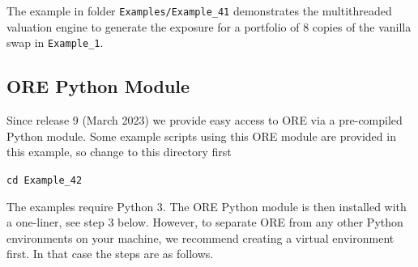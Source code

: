 The example in folder {\tt Examples/Example\_41} demonstrates the multithreaded valuation engine to generate the exposure for a
portfolio of 8 copies of the vanilla swap in {\tt Example\_1}.

\subsection{ORE Python Module}%
\label{example:42}

Since release 9 (March 2023) we provide easy access to ORE via a pre-compiled Python module. Some example scripts using this ORE module are provided in this example, so change to this directory first

\medskip
{\tt cd Example\_42}

\medskip
The examples require Python 3. The ORE Python module is then installed with a one-liner, see step 3 below. However, to separate ORE from any other Python environments on your machine, we recommend creating a virtual environment first. In that case the steps are as follows.

